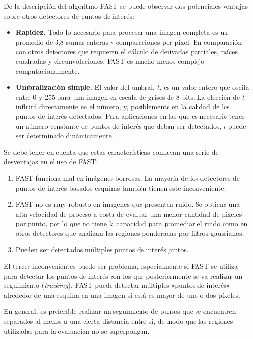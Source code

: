 De la descripción del algoritmo FAST se puede observar dos potenciales ventajas sobre otros detectores de puntos de interés:
\begin{itemize}
\item\textbf{Rapidez.} Todo lo necesario para procesar una imagen completa es un promedio de 3,8 sumas enteras y comparaciones por píxel. En comparación con otros detectores que requieren el cálculo de derivadas parciales, raíces cuadradas y circunvoluciones, FAST es mucho menos complejo computacionalmente.
\item\textbf{Umbralización simple.} El valor del umbral, $t$, es un valor entero que oscila entre 0 y 255 para una imagen en escala de grises de 8 bits. La elección de $t$ influirá directamente en el número, y, posiblemente en la calidad de los puntos de interés detectados. Para aplicaciones en las que es necesario tener un número constante de puntos de interés que deban ser detectados, $t$ puede ser determinado dinámicamente.
\end{itemize}

Se debe tener en cuenta que estas características conllevan una serie de desventajas en el uso de FAST: 
\begin{enumerate}
\item FAST funciona mal en imágenes borrosas. La mayoría de los detectores de puntos de interés basados esquinas también tienen este inconveniente.
\item FAST no es muy robusto en imágenes que presenten ruido. Se obtiene una alta velocidad de proceso a costa de evaluar una menor cantidad de píxeles por punto, por lo que  no tiene la capacidad para promediar el ruido como en otros detectores que analizan las regiones ponderadas por filtros gaussianos.
\item Pueden ser detectados múltiples puntos de interés juntos. 
\end{enumerate}

El tercer inconvenientes puede ser problema, especialmente si FAST se utiliza para detectar los puntos de interés con los que posteriormente se va realizar un seguimiento (\textit{tracking}). FAST puede detectar múltiples «puntos de interés» alrededor de una esquina en una imagen si está es mayor de uno o dos píxeles. 

En general, es preferible realizar un seguimiento de puntos que se encuentren separados al menos a una cierta distancia entre sí, de modo que las regiones utilizadas para la evaluación no se superpongan. 

